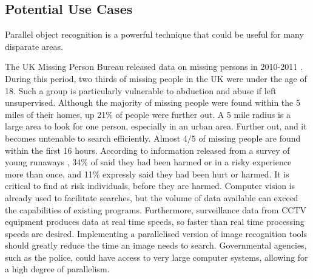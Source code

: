 \documentclass[../main.tex]{subfiles}
\begin{document}
    \subsection{Potential Use Cases}
    Parallel object recognition is a powerful technique that could be useful for many disparate areas.

    The UK Missing Person Bureau released data on missing persons in 2010-2011 \cite{missingpersons}.
    During this period, two thirds of missing people in the UK were under the age of 18.
    Such a group is particularly vulnerable to abduction and abuse if left unsupervised.
    Although the majority of missing people were found within the 5 miles of their homes, up 21\% of people were further out.
    A 5 mile radius is a large area to look for one person, especially in an urban area.
    Further out, and it becomes untenable to search efficiently.
    Almost $4/5$ of missing people are found within the first 16 hours.
    According to information released from a survey of young runaways \cite{stillrunning}, 34\% of said they had been harmed or in a risky experience more than once,  and 11\% expressly said they had been hurt or harmed.
    It is critical to find at risk individuals, before they are harmed.
    Computer vision is already used to facilitate searches, but the volume of data available can exceed the capabilities of existing programs. %
    Furthermore, surveillance data from CCTV equipment produces data at real time speeds, so faster than real time processing speeds are desired.
    Implementing a parallelised version of image recognition tools should greatly reduce the time an image needs to search.
    Governmental agencies, such as the police, could have access to very large computer systems, allowing for a high degree of parallelism.
\end{document}

